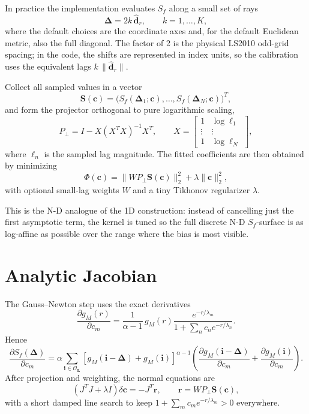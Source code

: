 \documentclass[11pt]{article}
\begin{document}
In practice the implementation evaluates \(S_f\) along a small set of rays
\begin{equation}
\bm \Delta = 2k\,\hat{\bm d}_r,
\qquad
k=1,\dots,K,
\end{equation}
where the default choices are the coordinate axes and, for the default Euclidean
metric, also the full diagonal.  The factor of 2 is the physical LS2010 odd-grid
spacing; in the code, the shifts are represented in index units, so the calibration
uses the equivalent lags
\(k\,\|\hat{\bm d}_r\|\).

Collect all sampled values in a vector
\begin{equation}
\bm S(\bm c)
=
\bigl(S_f(\bm \Delta_1;\bm c),\dots,S_f(\bm \Delta_N;\bm c)\bigr)^T,
\end{equation}
and form the projector orthogonal to pure logarithmic scaling,
\begin{equation}
P_\perp = I - X(X^T X)^{-1}X^T,
\qquad
X=
\begin{bmatrix}
1 & \log \ell_1\\
\vdots & \vdots\\
1 & \log \ell_N
\end{bmatrix},
\end{equation}
where \(\ell_n\) is the sampled lag magnitude.  The fitted coefficients are then
obtained by minimizing
\begin{equation}
\Phi(\bm c)
=
\|W P_\perp \bm S(\bm c)\|_2^2 + \lambda\|\bm c\|_2^2,
\end{equation}
with optional small-lag weights \(W\) and a tiny Tikhonov regularizer \(\lambda\).

This is the N-D analogue of the 1D construction: instead of cancelling just the
first asymptotic term, the kernel is tuned so the full discrete N-D
\(S_f\)-surface is as log-affine as possible over the range where the bias is most
visible.

\section{Analytic Jacobian}

The Gauss--Newton step uses the exact derivatives
\begin{equation}
\frac{\partial g_M(r)}{\partial c_m}
=
\frac{1}{\alpha-1}
\,g_M(r)
\frac{e^{-r/\lambda_m}}
     {1+\sum_n c_n e^{-r/\lambda_n}}.
\end{equation}
Hence
\begin{equation}
\frac{\partial S_f(\bm \Delta)}{\partial c_m}
=
\alpha
\sum_{\bm i \in \mathcal O_{\bm L}}
\left[g_M(\bm i-\bm \Delta)+g_M(\bm i)\right]^{\alpha-1}
\left(
\frac{\partial g_M(\bm i-\bm \Delta)}{\partial c_m}
+
\frac{\partial g_M(\bm i)}{\partial c_m}
\right).
\end{equation}
After projection and weighting, the normal equations are
\begin{equation}
\left(J^T J + \lambda I\right)\delta \bm c = -J^T \bm r,
\qquad
\bm r = W P_\perp \bm S(\bm c),
\end{equation}
with a short damped line search to keep
\(1+\sum_m c_m e^{-r/\lambda_m}>0\)
everywhere.
\end{document}
